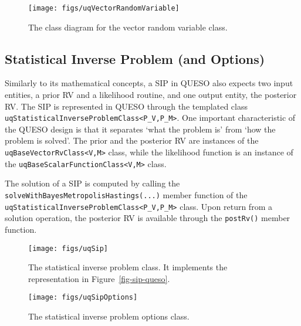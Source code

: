 \begin{figure}[htpb]
\centering
\texttt{[image: figs/uqVectorRandomVariable]}
\vspace{-8pt}
\caption{The class diagram for the vector random variable class.}
\label{fig-vector-rv-class}
\end{figure}



\subsection{Statistical Inverse Problem (and Options)}
Similarly to its mathematical concepts, a SIP in QUESO also expects two input entities, a prior RV and a likelihood routine, and one output entity, the posterior RV.
The SIP is represented in QUESO through the templated class \verb+uqStatisticalInverseProblemClass<P_V,P_M>+.
One important characteristic of the QUESO design is that it  separates `what the problem is' from `how the problem is solved'.
The prior and the posterior RV are instances of the \verb+uqBaseVectorRvClass<V,M>+ class, while
the likelihood function is an instance of the \verb+uqBaseScalarFunctionClass<V,M>+ class.

The solution of a SIP is computed by calling the \verb+solveWithBayesMetropolisHastings(...)+ member function of the \verb+uqStatisticalInverseProblemClass<P_V,P_M>+ class.
Upon return from a solution operation, the posterior RV is available through the \verb+postRv()+ member function.


\begin{figure}[htp!]
\centering
\texttt{[image: figs/uqSip]}
\vspace{-8pt}
\caption{The statistical inverse problem class. It implements the representation in Figure~\ref{fig-sip-queso}.}
\label{fig-sip-class}
\end{figure}

\begin{figure}[htp!]
\centering
\texttt{[image: figs/uqSipOptions]}
\vspace{-8pt}
\caption{The statistical inverse problem options class.}
\label{fig-sip-options-class}
\end{figure}

